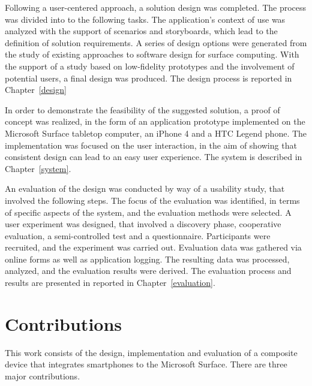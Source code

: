 Following a user-centered approach, a solution design was completed.
The process was divided into to the following tasks.
The application's context of use was analyzed with the support of scenarios and storyboards, which lead to the definition of solution requirements.
A series of design options were generated from the study of existing approaches to software design for surface computing.
With the support of a study based on low-fidelity prototypes and the involvement of potential users, a final design was produced.
The design process is reported in Chapter~\ref{design}

In order to demonstrate the feasibility of the suggested solution, a proof of concept was realized, in the form of an application prototype implemented on the Microsoft Surface tabletop computer, an iPhone 4 and a HTC Legend phone.
The implementation was focused on the user interaction, in the aim of showing that consistent design can lead to an easy user experience.
The system is described in Chapter~\ref{system}.


An evaluation of the design was conducted by way of a usability study, that involved the following steps.
The focus of the evaluation was identified, in terms of specific aspects of the system, and the evaluation methods were selected.
A user experiment was designed, that involved a discovery phase, cooperative evaluation, a semi-controlled test and a questionnaire.
Participants were recruited, and the experiment was carried out.
Evaluation data was gathered via online forms as well as application logging.
The resulting data was processed, analyzed, and the evaluation results were derived.
The evaluation process and results are presented in reported in Chapter~\ref{evaluation}.

\section{Contributions}

This work consists of the design, implementation and evaluation of a composite device that integrates smartphones to the Microsoft Surface.
There are three major contributions.


